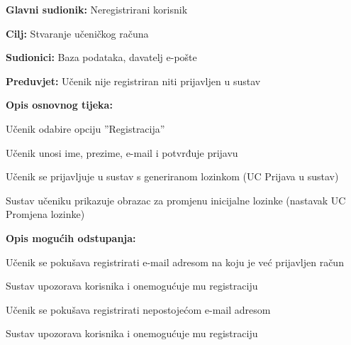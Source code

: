 \noindent {}
\begin{packed_item}

	\item \textbf{Glavni sudionik:} Neregistrirani korisnik
	\item  \textbf{Cilj:} Stvaranje učeničkog računa
	\item  \textbf{Sudionici:} Baza podataka, davatelj e-pošte
	\item  \textbf{Preduvjet:} Učenik nije registriran niti prijavljen u sustav
	\item  \textbf{Opis osnovnog tijeka:}
	
	\item[] \begin{packed_enum}

		\item Učenik odabire opciju ”Registracija”
		\item Učenik unosi ime, prezime, e-mail i potvrđuje prijavu
		\item Učenik se prijavljuje u sustav s generiranom lozinkom (UC Prijava u sustav)							
		\item Sustav učeniku prikazuje obrazac za promjenu inicijalne lozinke (nastavak UC Promjena lozinke)
	\end{packed_enum}
	
	\item  \textbf{Opis mogućih odstupanja:}
	
	\item[] \begin{packed_item}

		\item[2.a]Učenik se pokušava registrirati e-mail adresom na koju je već prijavljen račun
		\item[] \begin{packed_enum}
			
			\item Sustav upozorava korisnika i onemogućuje mu registraciju							
		\end{packed_enum}

\item[2.b] Učenik se pokušava registrirati nepostojećom e-mail adresom
\item[] \begin{packed_enum}

\item Sustav upozorava korisnika i onemogućuje mu registraciju 								
\end{packed_enum}

\end{packed_item}
\end{packed_item}

